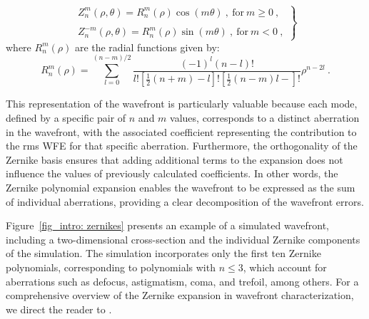 \begin{equation}
  \left.
  \begin{array}{l}
  Z _ n ^m (\rho, \theta) = R _ n ^m (\rho) \cos (m\theta)\ , \ \text{for} \ m \geqslant 0 \ ,\\
  \\
  Z _ n ^{-m} (\rho, \theta) = R _ n ^m (\rho) \sin (m\theta) \ , \ \text{for}  \ m < 0 \ ,
  \end{array}
  \right\}
\end{equation}
where $R _ n ^m (\rho)$ are the radial functions given by:
\begin{equation}
  R_n^m(\rho)=\sum_{l=0}^{(n-m) / 2} \frac{(-1)^l(n-l)!}{l!\left[\frac{1}{2}(n+m)-l\right]!\left[\frac{1}{2}(n-m)l-\right]!}\rho ^{n - 2l} \ .
\end{equation}

This representation of the wavefront is particularly valuable because each mode, defined by a specific pair of $n$ and $m$ values, corresponds to a distinct aberration in the wavefront, with the associated coefficient representing the contribution to the rms WFE for that specific aberration. Furthermore, the orthogonality of the Zernike basis ensures that adding additional terms to the expansion does not influence the values of previously calculated coefficients. In other words, the Zernike polynomial expansion enables the wavefront to be expressed as the sum of individual aberrations, providing a clear decomposition of the wavefront errors.

Figure~\ref{fig_intro: zernikes} presents an example of a simulated wavefront, including a two-dimensional cross-section and the individual Zernike components of the simulation. The simulation incorporates only the first ten Zernike polynomials, corresponding to polynomials with $n \leqslant 3$, which account for aberrations such as defocus, astigmatism, coma, and trefoil, among others. For a comprehensive overview of the Zernike expansion in wavefront characterization, we direct the reader to \citet{Zernike_guide}.

